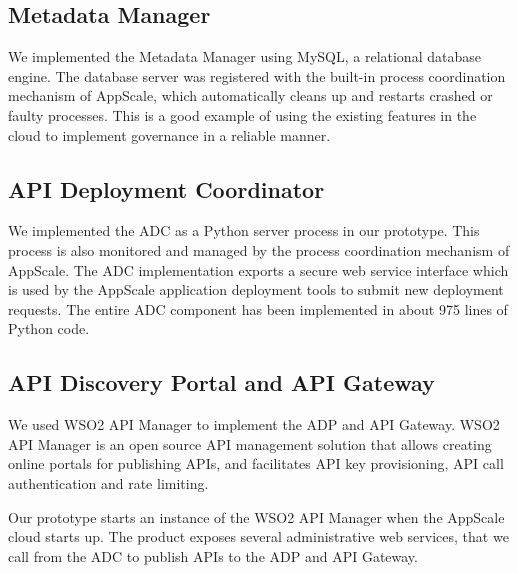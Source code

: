 \subsection{Metadata Manager}
We implemented the Metadata Manager using MySQL, a relational database engine. 
The database server was registered with the built-in process coordination mechanism of AppScale, which automatically
cleans up and restarts crashed or faulty processes. This is a good example of using the existing features in the cloud to implement
governance in a reliable manner.

\subsection{API Deployment Coordinator}
We implemented the ADC as a Python server process in our prototype. This process is also monitored and managed by the process
coordination mechanism of AppScale. The ADC implementation exports a secure web service interface which is used by the AppScale application 
deployment tools to submit new deployment requests. The entire ADC component has been implemented in about 975 lines of Python code. 

\subsection{API Discovery Portal and API Gateway}
We used WSO2 API Manager to implement the ADP and API Gateway. WSO2 API Manager is an open source API management solution that
allows creating online portals for publishing APIs, and facilitates API key provisioning, API call authentication and rate limiting. 

Our prototype starts an instance of the WSO2 API Manager when
the AppScale cloud starts up. The product exposes several
administrative web services, that we call from the ADC to publish APIs to the ADP and API Gateway. 
